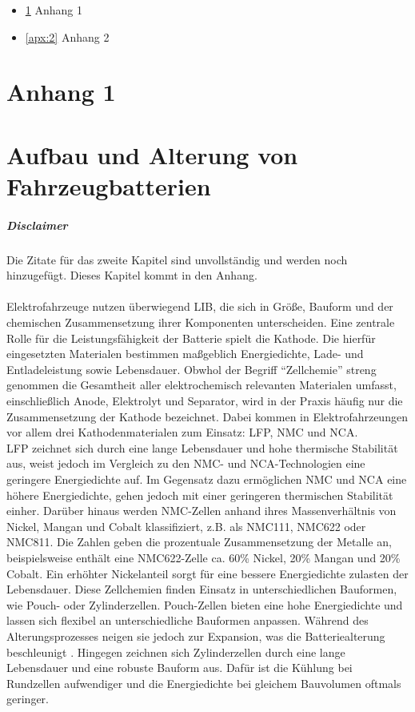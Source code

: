 
\begin{itemize}
	\item \ref{apx:1} Anhang 1 \dotfill{} \pageref{apx:1}
	\item \ref{apx:2} Anhang 2 \dotfill{} \pageref{apx:2}
\end{itemize}

\chapter{Anhang 1}
\label{apx:1}


\chapter{Aufbau und Alterung von Fahrzeugbatterien}
\paragraph{Disclaimer} Die Zitate für das zweite Kapitel sind unvollständig und werden noch hinzugefügt. Dieses Kapitel kommt in den Anhang.
\\\\
Elektrofahrzeuge nutzen überwiegend \acs{LIB}, die sich in Größe, Bauform und der chemischen Zusammensetzung ihrer Komponenten unterscheiden. Eine zentrale Rolle für die Leistungsfähigkeit der Batterie spielt die Kathode. Die hierfür eingesetzten Materialen bestimmen maßgeblich Energiedichte, Lade- und Entladeleistung sowie Lebensdauer. Obwhol der Begriff \enquote{Zellchemie} streng genommen die Gesamtheit aller elektrochemisch relevanten Materialen umfasst, einschließlich Anode, Elektrolyt und Separator, wird in der Praxis häufig nur die Zusammensetzung der Kathode bezeichnet. Dabei kommen in Elektrofahrzeungen vor allem drei Kathodenmaterialen zum Einsatz: \ac{LFP}, \ac{NMC} und \ac{NCA}.\\
\acs{LFP} zeichnet sich durch eine lange Lebensdauer und hohe thermische Stabilität aus, weist jedoch im Vergleich zu den \acs{NMC}- und \acs{NCA}-Technologien eine geringere Energiedichte auf. Im Gegensatz dazu ermöglichen \acs{NMC} und \acs{NCA} eine höhere Energiedichte, gehen jedoch mit einer geringeren thermischen Stabilität einher. Darüber hinaus werden \acs{NMC}-Zellen anhand ihres Massenverhältnis von Nickel, Mangan und Cobalt klassifiziert, z.B. als \acs{NMC}111, \acs{NMC}622 oder \acs{NMC}811. Die Zahlen geben die prozentuale Zusammensetzung der Metalle an, beispielsweise enthält eine \acs{NMC}622-Zelle ca. 60\% Nickel, 20\% Mangan und 20\% Cobalt. Ein erhöhter Nickelanteil sorgt für eine bessere Energiedichte zulasten der Lebensdauer. Diese Zellchemien finden Einsatz in unterschiedlichen Bauformen, wie Pouch- oder Zylinderzellen.
Pouch-Zellen bieten eine hohe Energiedichte und lassen sich flexibel an unterschiedliche Bauformen anpassen. Während des Alterungsprozesses neigen sie jedoch zur Expansion, was die Batteriealterung beschleunigt \cite{articlePouchZellenAlterung}. Hingegen zeichnen sich Zylinderzellen durch eine lange Lebensdauer und eine robuste Bauform aus. Dafür ist die Kühlung bei Rundzellen aufwendiger und die Energiedichte bei gleichem Bauvolumen oftmals geringer.
